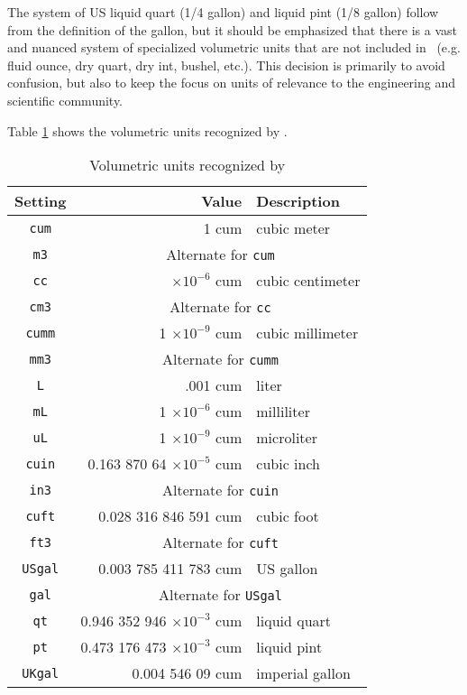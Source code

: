 The system of US liquid quart (1/4 gallon) and liquid pint (1/8 gallon) follow from the definition of the gallon, but it should be emphasized that there is a vast and nuanced system of specialized volumetric units that are not included in \PM\ (e.g. fluid ounce, dry quart, dry int, bushel, etc.).  This decision is primarily to avoid confusion, but also to keep the focus on units of relevance to the engineering and scientific community.

Table \ref{tab:volume} shows the volumetric units recognized by \PM .

\begin{table}
\centering
\caption{Volumetric units recognized by \PM}\label{tab:volume}
\begin{tabular}{crl}
\hline
Setting & Value & Description\\
\hline
\verb|cum| & 1 cum & cubic meter\\
\verb|m3| & \multicolumn{2}{c}{Alternate for \texttt{cum}}\\
\verb|cc| & $\times 10^{-6}$ cum & cubic centimeter\\
\verb|cm3| & \multicolumn{2}{c}{Alternate for \texttt{cc}}\\
\verb|cumm| & 1 $\times 10^{-9}$ cum & cubic millimeter\\
\verb|mm3| & \multicolumn{2}{c}{Alternate for \texttt{cumm}}\\
\verb|L| & .001 cum & liter\\
\verb|mL| & 1 $\times 10^{-6}$ cum & milliliter\\
\verb|uL| & 1 $\times 10^{-9}$ cum & microliter\\
\verb|cuin| & 0.163 870 64 $\times 10^{-5}$ cum & cubic inch\\
\verb|in3| & \multicolumn{2}{c}{Alternate for \texttt{cuin}}\\
\verb|cuft| & 0.028 316 846 591 cum & cubic foot\\
\verb|ft3| & \multicolumn{2}{c}{Alternate for \texttt{cuft}}\\
\verb|USgal| & 0.003 785 411 783 cum & US gallon\\
\verb|gal| & \multicolumn{2}{c}{Alternate for \texttt{USgal}}\\
\verb|qt| & 0.946 352 946 $\times 10^{-3}$ cum & liquid quart\\
\verb|pt| & 0.473 176 473 $\times 10^{-3}$ cum & liquid pint\\
\verb|UKgal| & 0.004 546 09 cum & imperial gallon\\
\hline
\end{tabular}
\end{table}
